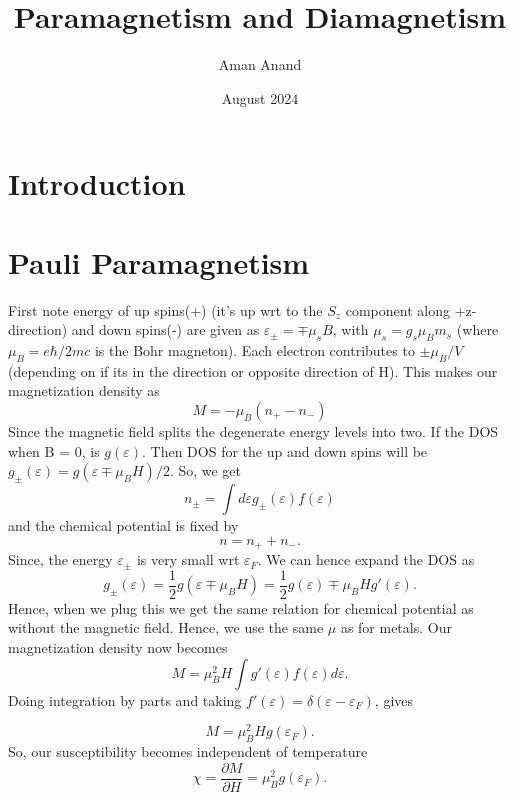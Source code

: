 \documentclass{article}
\title{Paramagnetism and Diamagnetism}
\author{Aman Anand}
\date{August 2024}
\begin{document}
	
	\maketitle
	
	\section{Introduction}
	
	
	
	\section{Pauli Paramagnetism}
	First note energy of up spins(+) (it's up wrt to the $S_z$ component along +z-direction) and down spins(-) are given as $\varepsilon_{\pm} = \mp \mu_s B$, with $\mu_s = g_s \mu_B m_s $ (where $\mu_B = e\hbar/2mc$ is the Bohr magneton). Each electron contributes to $\pm \mu_B/V$ (depending on if its in the direction or opposite direction of H). This makes our magnetization density as
	\begin{equation}
		M = -\mu_B (n_+ - n_-)
	\end{equation}
	Since the magnetic field splits the degenerate energy levels into two. If the DOS when B = 0, is $g(\varepsilon)$. Then DOS for the up and down spins will be $g_{\pm} (\varepsilon) = g(\varepsilon \mp \mu_B H)/2$. So, we get
	\begin{equation}
		n_{\pm} = \int d\varepsilon g_{\pm}(\varepsilon)f(\varepsilon)
	\end{equation}                        
	and the chemical potential is fixed by
	\begin{equation}
		n = n_+ +n_- .
	\end{equation}
	Since, the energy $\varepsilon_{\pm}$ is very small wrt $\varepsilon_F$. We can hence expand the DOS as
	\begin{equation}
		g_{\pm} (\varepsilon) = \frac{1}{2} g(\varepsilon \mp \mu_B H) = \frac{1}{2} g(\varepsilon) \mp \mu_B H g'(\varepsilon).
	\end{equation}
	Hence, when we plug this we get the same relation for chemical potential as without the magnetic field. Hence, we use the same $\mu$ as for metals. Our magnetization density now becomes
	\begin{equation}
		M = \mu_B ^2 H \int g'(\varepsilon) f(\varepsilon) d\varepsilon .
	\end{equation}
	Doing integration by parts and taking $f'(\varepsilon) = \delta(\varepsilon-\varepsilon_F)$, gives
	
	\begin{equation}
		M = \mu_B ^2 H g(\varepsilon_F).
	\end{equation}
	So, our susceptibility becomes independent of temperature
	\begin{equation}
		\chi = \frac{\partial M}{\partial H} = \mu_B ^2 g(\varepsilon_F).
	\end{equation}
	
	
	
	
	
\end{document}
